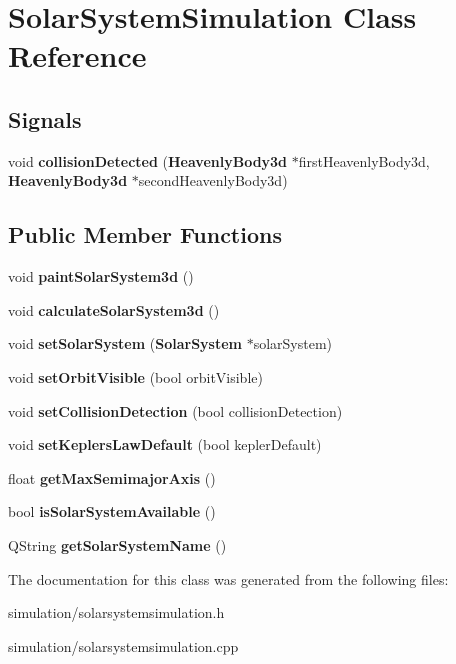 \section{\-Solar\-System\-Simulation \-Class \-Reference}
\label{d7/d64/classSolarSystemSimulation}
\subsection*{\-Signals}
\begin{DoxyCompactItemize}
\item 
void {\bfseries collision\-Detected} ({\bf \-Heavenly\-Body3d} $\ast$first\-Heavenly\-Body3d, {\bf \-Heavenly\-Body3d} $\ast$second\-Heavenly\-Body3d)\label{d7/d64/classSolarSystemSimulation_ada4e418772aaed030ee746611fa44df1}

\end{DoxyCompactItemize}
\subsection*{\-Public \-Member \-Functions}
\begin{DoxyCompactItemize}
\item 
void {\bfseries paint\-Solar\-System3d} ()\label{d7/d64/classSolarSystemSimulation_a6d3f9f594e299d57ba6d16ed10b96540}

\item 
void {\bfseries calculate\-Solar\-System3d} ()\label{d7/d64/classSolarSystemSimulation_a957a5287d6df1eb3bc8d3eafec08b27a}

\item 
void {\bfseries set\-Solar\-System} ({\bf \-Solar\-System} $\ast$solar\-System)\label{d7/d64/classSolarSystemSimulation_a08f2e91e1d546289639b796c5abc0a25}

\item 
void {\bfseries set\-Orbit\-Visible} (bool orbit\-Visible)\label{d7/d64/classSolarSystemSimulation_a01a0daa6b8c504803ea79691642e0bc6}

\item 
void {\bfseries set\-Collision\-Detection} (bool collision\-Detection)\label{d7/d64/classSolarSystemSimulation_a1e1e255704626eda098072a906606d9d}

\item 
void {\bfseries set\-Keplers\-Law\-Default} (bool kepler\-Default)\label{d7/d64/classSolarSystemSimulation_a2882dd655f62b2ab38c2ec861a80327b}

\item 
float {\bfseries get\-Max\-Semimajor\-Axis} ()\label{d7/d64/classSolarSystemSimulation_a740f69c469618089d17ae07e3514bf23}

\item 
bool {\bfseries is\-Solar\-System\-Available} ()\label{d7/d64/classSolarSystemSimulation_a26cf1e8bf60c274937eef913075925ee}

\item 
\-Q\-String {\bfseries get\-Solar\-System\-Name} ()\label{d7/d64/classSolarSystemSimulation_a4f969504bab1dd1a57087dd673c3350b}

\end{DoxyCompactItemize}


\-The documentation for this class was generated from the following files\-:\begin{DoxyCompactItemize}
\item 
simulation/solarsystemsimulation.\-h\item 
simulation/solarsystemsimulation.\-cpp\end{DoxyCompactItemize}
